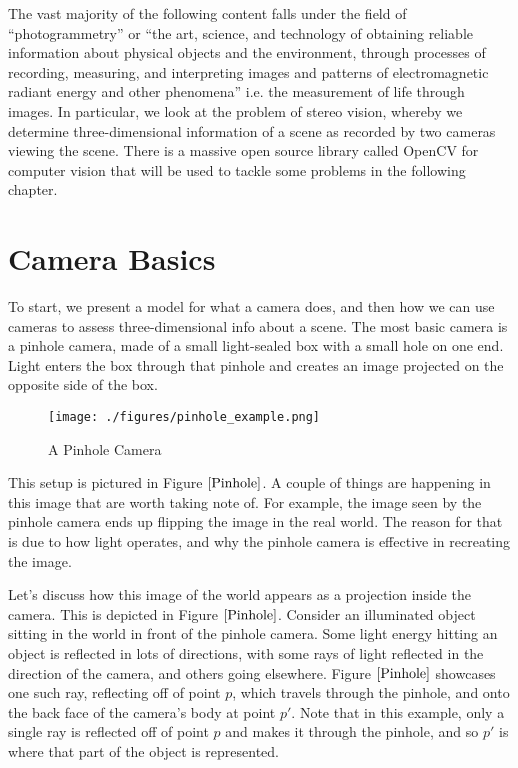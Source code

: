 \documentclass[
    12pt,
    twoside,
    bibstyle=chicago,
    headerstyle=uppercase,
	bibfile=biblatex_updating.bib
]{reedthesis}
\begin{document}
The vast majority of the following content falls under the field of “photogrammetry” or “the art, science, and technology of obtaining reliable information about physical objects and the environment, through processes of recording, measuring, and interpreting images and patterns of electromagnetic radiant energy and other phenomena” i.e. the measurement of life through images. In particular, we look at the problem of stereo vision, whereby we determine three-dimensional information of a scene as recorded by two cameras viewing the scene. There is a massive open source library called OpenCV for computer vision that will be used to tackle some problems in the following chapter. \autocite{pulliRealtimeComputerVision2012}


\section{Camera Basics}
To start, we present a model for what a camera does, and then how we can use cameras to assess three-dimensional info about a scene. The most basic camera is a pinhole camera, made of a small light-sealed box with a small hole on one end. Light enters the box through that pinhole and creates an image projected on the opposite side of the box.

\begin{figure}[h]
	    \centering
	    \texttt{[image: ./figures/pinhole\_example.png]}
	    \caption{A Pinhole Camera}
	\label{Pinhole}
	\end{figure}

This setup is pictured in Figure $\ref{Pinhole}$. A couple of things are happening in this image that are worth taking note of. For example, the image seen by the pinhole camera ends up flipping the image in the real world. The reason for that is due to how light operates, and why the pinhole camera is effective in recreating the image.

Let's discuss how this image of the world appears as a projection inside the camera. This is depicted in Figure $\ref{Pinhole}$. Consider an illuminated object sitting in the world in front of the pinhole camera. Some light energy hitting an object is reflected in lots of directions, with some rays of light reflected in the direction of the camera, and others going elsewhere. Figure $\ref{Pinhole}$ showcases one such ray, reflecting off of point $p$, which travels through the pinhole, and onto the back face of the camera's body at point $p'$. Note that in this example, only a single ray is reflected off of point $p$ and makes it through the pinhole, and so $p'$ is where that part of the object is represented.
\end{document}
